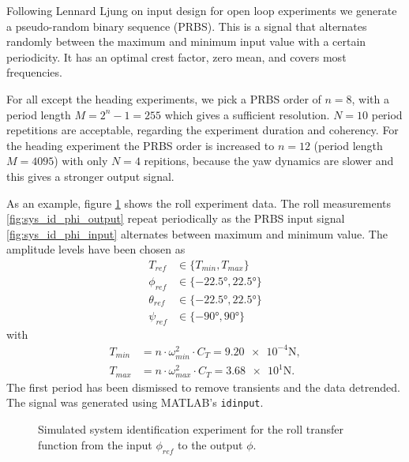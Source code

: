 Following Lennard Ljung on input design for open loop experiments \cite{ljung1999system} we generate a pseudo-random binary sequence (PRBS). This is a signal that alternates randomly between the maximum and minimum input value with a certain periodicity. It has an optimal crest factor, zero mean, and covers most frequencies. 

For all except the heading experiments, we pick a PRBS order of $n=8$, with a period length $M = 2^n-1 = 255$ which gives a sufficient resolution. $N = 10$ period repetitions are acceptable, regarding the experiment duration and coherency. For the heading experiment the PRBS order is increased to $n=12$ (period length $M=4095$) with only $N =4$ repitions, because the yaw dynamics are slower and this gives a stronger output signal. 

As an example, figure \ref{fig:sys_id_phi} shows the roll experiment data. The roll measurements \ref{fig:sys_id_phi_output} repeat periodically as the PRBS input signal \ref{fig:sys_id_phi_input} alternates between maximum and minimum value.  The amplitude levels have been chosen as
\begin{align}
T_{ref} &\in \{T_{min},T_{max}\} \\
\phi_{ref} &\in \{-22.5\si{\degree},22.5\si{\degree}\} \\
\theta_{ref} &\in \{-22.5\si{\degree},22.5\si{\degree}\} \\
\psi_{ref} &\in \{-90\si{\degree},90\si{\degree}\}
\end{align}
with
\begin{align}
T_{min} &= n \cdot \omega_{min}^2 \cdot C_T =  \num{9.20e-4} \si{\newton} , \label{eq:T_min}\\
T_{max} &= n \cdot \omega_{max}^2 \cdot C_T =  \num{3.68e1}\si{\newton} .\label{eq:T_max}
\end{align}
The first period has been dismissed to remove transients and the data detrended. The signal was generated using MATLAB's \texttt{idinput}.

\begin{figure}
\centering
{}
\qquad
{}
\caption[Simulated system identification experiment]{Simulated system identification experiment for the roll transfer function from the input $\phi_{ref}$ to the output $\phi$.}
\label{fig:sys_id_phi}
\end{figure}

